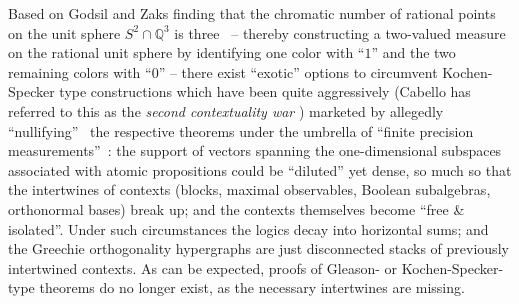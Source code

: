 Based on Godsil and Zaks finding that the chromatic number of rational points on the  unit sphere
$S^2\cap \mathbb{Q}^3$
is three~\cite[Lemma~1.2]{godsil-zaks} -- thereby constructing a two-valued measure on the rational unit sphere
by identifying one color with ``$1$'' and the two remaining colors with ``$0$'' --
there exist ``exotic'' options to circumvent Kochen-Specker type constructions which have been quite aggressively (Cabello has referred to this
as the {\em second contextuality war} \cite{Cabello-talk-Vajo-2017})
marketed by allegedly ``nullifying''~\cite{meyer:99} the respective theorems
under the umbrella of ``finite precision measurements''~\cite{kent:99,clifton:99,mermin-99iks,Breuer-02a,Breuer-02b,Barrett-2004}:
the support of vectors spanning the one-dimensional subspaces associated with atomic propositions could be ``diluted'' yet dense,
so much so that the intertwines of contexts (blocks, maximal observables, Boolean subalgebras, orthonormal bases) break up;
and the contexts themselves become ``free \& isolated''.
Under such circumstances the logics decay into horizontal sums;
and the Greechie orthogonality hypergraphs are just disconnected stacks of previously intertwined contexts.
As can be expected, proofs of Gleason- or Kochen-Specker-type theorems do no longer exist,
as the necessary intertwines are missing.


